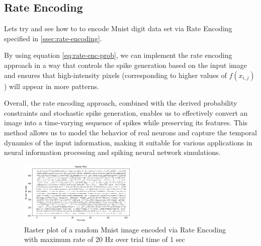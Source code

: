 \subsection{Rate Encoding}

Lets try and see how to to encode Mnist digit data set via Rate Encoding specified in \ref{ssec:rate-encoding}.

By using equation \ref{eq:rate-enc-prob}, we can implement the rate encoding approach in a way that controls the spike generation based on the input image and ensures that high-intensity pixels (corresponding to higher values of \(f(x_{i,j})\)) will appear in more patterns.

Overall, the rate encoding approach, combined with the derived probability constraints and stochastic spike generation, enables us to effectively convert an image into a time-varying sequence of spikes while preserving its features. This method allows us to model the behavior of real neurons and capture the temporal dynamics of the input information, making it suitable for various applications in neural information processing and spiking neural network simulations.

\begin{figure}[H]
    \centering
    \includegraphics[width=0.5\textwidth]{methods/spike-encoding/graphs/rate-encoding-raster.png}
    \caption{Raster plot of a random Mnist image encoded via Rate Encoding with maximum rate of 20 Hz over trial time of 1 sec}
    \label{fig:rate-encoding-raster}
\end{figure}
